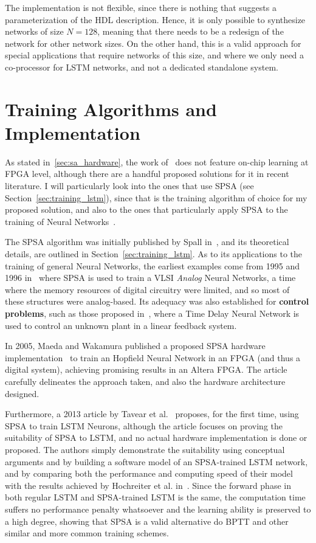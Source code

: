 The implementation is not flexible, since there is nothing that suggests a parameterization of the HDL description.
Hence, it is only possible to synthesize networks of size $N=128$, meaning that there needs to be a redesign of the network
for other network sizes. On the other hand, this is a valid approach for special applications that require networks of
this size, and where we only need a co-processor for LSTM networks, and not a dedicated standalone system.

\section{Training Algorithms and Implementation}\label{sec:sa_training}
As stated in~\ref{sec:sa_hardware}, the work of~\cite{Chang15} does not feature on-chip learning at FPGA level, although there
are a handful proposed solutions for it in recent literature. I will particularly look into the ones that use SPSA (see
Section~\ref{sec:training_lstm}), since that is the training algorithm of choice for my proposed solution, and also to the
ones that particularly apply SPSA to the training of Neural Networks~\cite{Maeda05}.

The SPSA algorithm was initially published by Spall in~\cite{Spall98}, and its theoretical details, are outlined in
Section~\ref{sec:training_lstm}. As to its applications to the training of general Neural Networks, the earliest examples
come from 1995 and 1996 in~\cite{Maeda95, Cauwen96} where SPSA is used to train a VLSI \emph{Analog} Neural Networks, a time
where the memory resources of digital circuitry were limited, and so most of these structures were analog-based. Its adequacy
was also established for \textbf{control problems}, such as those proposed in~\cite{Figueiredo97}, where a Time Delay Neural
Network is used to control an unknown plant in a linear feedback system.

In 2005, Maeda and Wakamura published a proposed SPSA hardware implementation~\cite{Maeda05} to train an Hopfield Neural Network
in an FPGA (and thus a digital system), achieving promising results in an Altera FPGA. The article carefully delineates the approach
taken, and also the hardware architecture designed.

Furthermore, a 2013 article by Tavear et al.~\cite{Tavear13} proposes, for the first time, using SPSA to train LSTM Neurons, although
the article focuses on proving the suitability of SPSA to LSTM, and no actual hardware implementation is done or proposed. The authors
simply demonstrate the suitability using conceptual arguments and by building a software model of an SPSA-trained LSTM network, and by
comparing both the performance and computing speed of their model with the results achieved by Hochreiter et al. in~\cite{Hochreiter07}.
Since the forward phase in both regular LSTM and SPSA-trained LSTM is the same, the computation time suffers no performance penalty whatsoever
and the learning ability is preserved to a high degree, showing that SPSA is a valid alternative do BPTT and other similar and more common training schemes.

